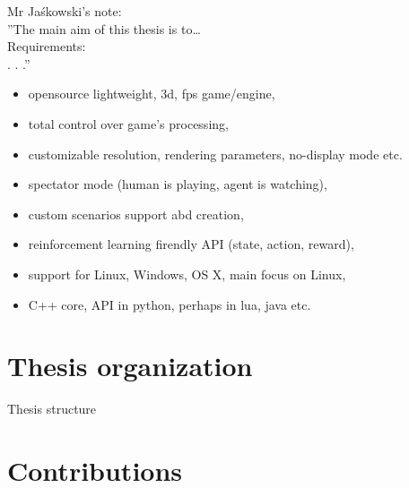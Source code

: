 Mr Jaśkowski's note:\\
''The main aim of this thesis is to…\\
Requirements:\\
. . .''
\begin{itemize}
	\item opensource lightweight, 3d, fps game/engine,
	\item total control over game's processing,
	\item customizable resolution, rendering parameters, no-display mode etc.
	\item spectator mode (human is playing, agent is watching),
	\item custom scenarios support abd creation,
	\item reinforcement learning firendly API (state, action, reward),
	\item support for Linux, Windows, OS X, main focus on Linux,
	\item C++ core, API in python, perhaps in lua, java etc.
\end{itemize}
	
\section{Thesis organization}
Thesis structure

\section{Contributions}
